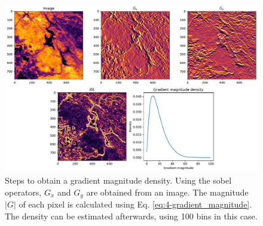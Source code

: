          \begin{figure}
             \centering
             \includegraphics[width=\textwidth]{Includes/4-gradient-analysis.pdf}
             \caption{Steps to obtain a gradient magnitude density. Using the sobel operators, $G_x$ and $G_y$ are obtained from an image. The magnitude $|G|$ of each pixel is calculated using Eq. \ref{eq:4-gradient_magnitude}. The density can be estimated afterwards, using 100 bins in this case.}
             \label{fig:4-gradient-analysis}
         \end{figure}

         

\clearpage

        

        
        
